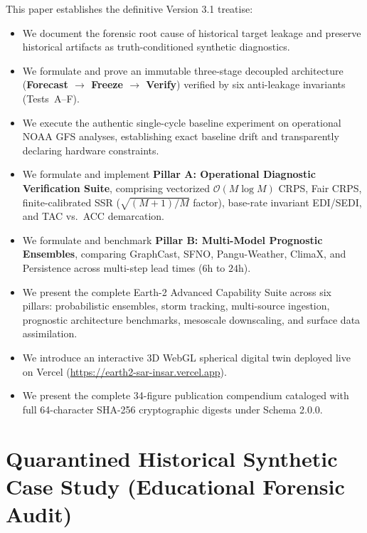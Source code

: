 \documentclass[10pt,twocolumn,letterpaper]{article}
\begin{document}
This paper establishes the definitive Version 3.1 treatise:
\begin{itemize}
    \item We document the forensic root cause of historical target leakage and preserve historical artifacts as truth-conditioned synthetic diagnostics.
    \item We formulate and prove an immutable three-stage decoupled architecture (\textbf{Forecast $\to$ Freeze $\to$ Verify}) verified by six anti-leakage invariants (Tests~A--F).
    \item We execute the authentic single-cycle baseline experiment on operational NOAA GFS analyses, establishing exact baseline drift and transparently declaring hardware constraints.
    \item We formulate and implement \textbf{Pillar A: Operational Diagnostic Verification Suite}, comprising vectorized $\mathcal{O}(M \log M)$ CRPS, Fair CRPS, finite-calibrated SSR ($\sqrt{(M+1)/M}$ factor), base-rate invariant EDI/SEDI, and TAC vs.\ ACC demarcation.
    \item We formulate and benchmark \textbf{Pillar B: Multi-Model Prognostic Ensembles}, comparing GraphCast, SFNO, Pangu-Weather, ClimaX, and Persistence across multi-step lead times ($6\text{h}$ to $24\text{h}$).
    \item We present the complete Earth-2 Advanced Capability Suite across six pillars: probabilistic ensembles, storm tracking, multi-source ingestion, prognostic architecture benchmarks, mesoscale downscaling, and surface data assimilation.
    \item We introduce an interactive 3D WebGL spherical digital twin deployed live on Vercel (\url{https://earth2-sar-insar.vercel.app}).
    \item We present the complete 34-figure publication compendium cataloged with full 64-character SHA-256 cryptographic digests under Schema 2.0.0.
\end{itemize}

\section{Quarantined Historical Synthetic Case Study (Educational Forensic Audit)}
\end{document}
